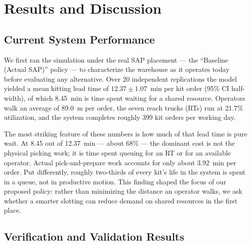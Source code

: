 
\section{Results and Discussion}\label{sec:results}

\subsection{Current System Performance}\label{sec:results:current}

We first ran the simulation under the real SAP placement ---
the ``Baseline (Actual SAP)'' policy --- to characterize the warehouse
as it operates today before evaluating any alternative.  Over 20
independent replications the model yielded a mean kitting lead time of
$12.37 \pm 1.07$~min per kit order (95\% CI half-width), of which
8.45~min is time spent waiting for a shared resource.  Operators walk
an average of 89.0~m per order, the seven reach trucks (RTs) run at
21.7\% utilization, and the system completes roughly 399 kit orders
per working day.

The most striking feature of these numbers is how much of that lead
time is pure wait.  At 8.45 out of 12.37~min --- about 68\% --- the
dominant cost is not the physical picking work; it is time spent
queuing for an RT or for an available operator.  Actual
pick-and-prepare work accounts for only about 3.92~min per order.
Put differently, roughly two-thirds of every kit's life in the system
is spent in a queue, not in productive motion.  This finding shaped the
focus of our proposed policy: rather than minimizing the distance an
operator walks, we ask whether a smarter slotting can reduce demand on
shared resources in the first place.

\subsection{Verification and Validation Results}\label{sec:results:vv}




